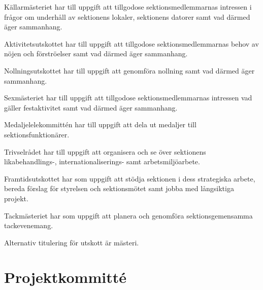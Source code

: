 \documentclass[stadgar]{dsekprotokoll}
\begin{document}
\begin{stadgeavsnitt}

Källarmästeriet har till uppgift att tillgodose sektionsmedlemmarnas intressen i frågor om underhåll av sektionens lokaler, sektionens datorer samt vad därmed äger sammanhang.


Aktivitetsutskottet har till uppgift att tillgodose sektionsmedlemmarnas behov
av nöjen och förströelser samt vad därmed äger sammanhang.


Nollningsutskottet har till uppgift att genomföra nollning samt vad därmed äger sammanhang.


Sexmästeriet har till uppgift att tillgodose sektionsmedlemmarnas intressen
vad gäller festaktivitet samt vad därmed äger sammanhang.


Medaljelelekommittén har till uppgift att dela ut medaljer till
sektionsfunktionärer.


Trivselrådet har till uppgift att organisera och se över sektionens likabehandlings-, internationaliserings- samt arbetsmiljöarbete.


Framtidsutskottet har som uppgift att stödja sektionen i dess strategiska arbete, bereda förslag för styrelsen och sektionsmötet samt jobba med långsiktiga projekt.


Tackmästeriet har som uppgift att planera och genomföra sektionsgemensamma tackevenemang.


Alternativ titulering för utskott är mästeri.

\end{stadgeavsnitt}

\section{Projektkommitté}
\end{document}
